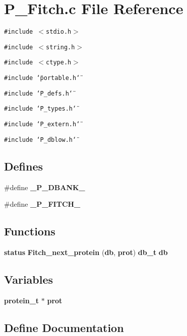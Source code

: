 \section{P\_\-Fitch.c File Reference}
\label{P__Fitch_8c}
{\tt \#include $<$stdio.h$>$}\par
{\tt \#include $<$string.h$>$}\par
{\tt \#include $<$ctype.h$>$}\par
{\tt \#include \char`\"{}portable.h\char`\"{}}\par
{\tt \#include \char`\"{}P\_\-defs.h\char`\"{}}\par
{\tt \#include \char`\"{}P\_\-types.h\char`\"{}}\par
{\tt \#include \char`\"{}P\_\-extern.h\char`\"{}}\par
{\tt \#include \char`\"{}P\_\-dblow.h\char`\"{}}\par
\subsection*{Defines}
\begin{CompactItemize}
\item 
\#define {\bf \_\-P\_\-DBANK\_\-}
\item 
\#define {\bf \_\-P\_\-FITCH\_\-}
\end{CompactItemize}
\subsection*{Functions}
\begin{CompactItemize}
\item 
{\bf status} {\bf Fitch\_\-next\_\-protein} ({\bf db}, {\bf prot}) {\bf db\_\-t} {\bf db}
\end{CompactItemize}
\subsection*{Variables}
\begin{CompactItemize}
\item 
{\bf protein\_\-t} $\ast$ {\bf prot}
\end{CompactItemize}


\subsection{Define Documentation}
